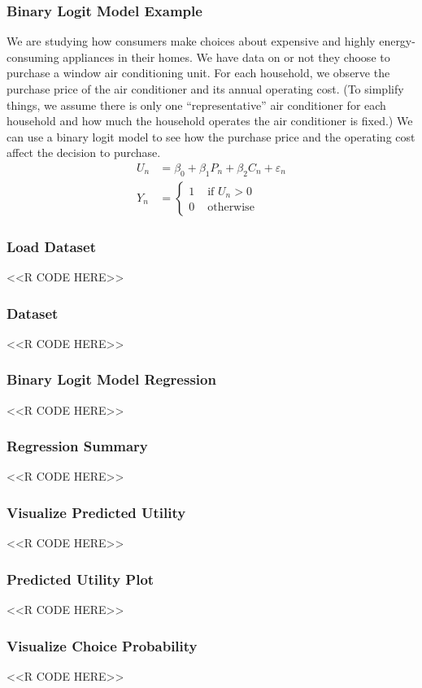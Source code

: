 \documentclass{beamer}
\begin{document}
\begin{frame}\frametitle{Binary Logit Model Example}
    We are studying how consumers make choices about expensive and highly energy-consuming appliances in their homes. We have data on  or not they choose to purchase a window air conditioning unit. For each household, we observe the purchase price of the air conditioner and its annual operating cost. (To simplify things, we assume there is only one ``representative'' air conditioner for each household and how much the household operates the air conditioner is fixed.) We can use a binary logit model to see how the purchase price and the operating cost affect the decision to purchase.
    \begin{align*}
    	U_n &= \beta_0 + \beta_1 P_n + \beta_2 C_n + \varepsilon_n \\
    	Y_n &= 
    		\begin{cases}
    			1 & \text{ if } U_n > 0 \\
    			0 & \text{ otherwise}
    		\end{cases}
    \end{align*}
\end{frame}

\begin{frame}[fragile]\frametitle{Load Dataset}
    <<R CODE HERE>>
\end{frame}

\begin{frame}[fragile]\frametitle{Dataset}
    <<R CODE HERE>>
\end{frame}

\begin{frame}[fragile]\frametitle{Binary Logit Model Regression}
    <<R CODE HERE>>
\end{frame}

\begin{frame}[fragile]\frametitle{Regression Summary}
    <<R CODE HERE>>
\end{frame}

\begin{frame}[fragile]\frametitle{Visualize Predicted Utility}
    <<R CODE HERE>>
\end{frame}

\begin{frame}[fragile]\frametitle{Predicted Utility Plot}
    <<R CODE HERE>>
\end{frame}

\begin{frame}[fragile]\frametitle{Visualize Choice Probability}
    <<R CODE HERE>>
\end{frame}
\end{document}
